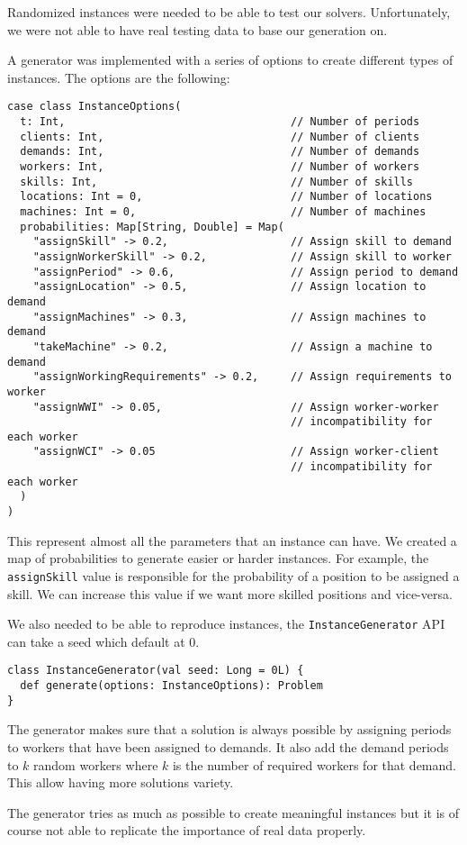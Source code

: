\documentclass[../thesis.tex]{subfiles}
\begin{document}
Randomized instances were needed to be able to test our solvers. Unfortunately, we were not 
able to have real testing data to base our generation on. 

A generator was implemented with a series of options to create different types of instances. The options are the following:


\begin{lstlisting}[style=scalaStyle,label={instance:options},caption={Instance options},captionpos=b]
case class InstanceOptions(
  t: Int,                                   // Number of periods 
  clients: Int,                             // Number of clients 
  demands: Int,                             // Number of demands 
  workers: Int,                             // Number of workers 
  skills: Int,                              // Number of skills 
  locations: Int = 0,                       // Number of locations 
  machines: Int = 0,                        // Number of machines
  probabilities: Map[String, Double] = Map(
    "assignSkill" -> 0.2,                   // Assign skill to demand
    "assignWorkerSkill" -> 0.2,             // Assign skill to worker
    "assignPeriod" -> 0.6,                  // Assign period to demand
    "assignLocation" -> 0.5,                // Assign location to demand
    "assignMachines" -> 0.3,                // Assign machines to demand
    "takeMachine" -> 0.2,                   // Assign a machine to demand
    "assignWorkingRequirements" -> 0.2,     // Assign requirements to worker
    "assignWWI" -> 0.05,                    // Assign worker-worker 
                                            // incompatibility for each worker 
    "assignWCI" -> 0.05                     // Assign worker-client
                                            // incompatibility for each worker
  )
)
\end{lstlisting}

This represent almost all the parameters that an instance can have. We created a
map of probabilities to generate easier or harder instances. For example,
the \texttt{assignSkill} value is responsible for the probability of a position to be assigned a skill. 
We can increase this value if we want more skilled positions and vice-versa.

We also needed to be able to reproduce instances, the \texttt{InstanceGenerator} API can 
take a seed which default at $0$.

  
\begin{lstlisting}[style=scalaStyle,caption={Instance generator API},captionpos=b]
class InstanceGenerator(val seed: Long = 0L) {
  def generate(options: InstanceOptions): Problem
}
\end{lstlisting}

The generator makes sure that a solution is always possible by assigning periods to workers 
that have been assigned to demands. It also add the demand periods to $k$ random workers
where $k$ is the number of required workers for that demand. This allow having more solutions variety.
    
The generator tries as much as possible to create meaningful instances but it is of course not able to replicate the importance of real data properly.
\end{document}
